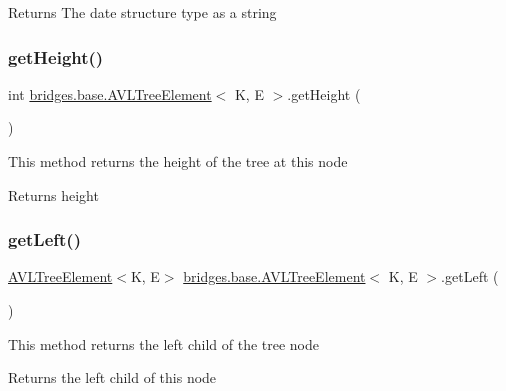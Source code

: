 \begin{DoxyReturn}{Returns}
The date structure type as a string 
\end{DoxyReturn}
\mbox{\label{classbridges_1_1base_1_1_a_v_l_tree_element_a52fe2886334c841547d238db69022697}} 
\subsubsection{\texorpdfstring{get\+Height()}{getHeight()}}
{\footnotesize\ttfamily int \mbox{\hyperlink{classbridges_1_1base_1_1_a_v_l_tree_element}{bridges.\+base.\+A\+V\+L\+Tree\+Element}}$<$ K, E $>$.get\+Height (\begin{DoxyParamCaption}{ }\end{DoxyParamCaption})}

This method returns the height of the tree at this node

\begin{DoxyReturn}{Returns}
height 
\end{DoxyReturn}
\mbox{\label{classbridges_1_1base_1_1_a_v_l_tree_element_a86f1329b19d2886ba7bf713e3844ecd6}} 
\subsubsection{\texorpdfstring{get\+Left()}{getLeft()}}
{\footnotesize\ttfamily \mbox{\hyperlink{classbridges_1_1base_1_1_a_v_l_tree_element}{A\+V\+L\+Tree\+Element}}$<$K, E$>$ \mbox{\hyperlink{classbridges_1_1base_1_1_a_v_l_tree_element}{bridges.\+base.\+A\+V\+L\+Tree\+Element}}$<$ K, E $>$.get\+Left (\begin{DoxyParamCaption}{ }\end{DoxyParamCaption})}

This method returns the left child of the tree node

\begin{DoxyReturn}{Returns}
the left child of this node 
\end{DoxyReturn}
\mbox{\label{classbridges_1_1base_1_1_a_v_l_tree_element_aab93418ac19605f2c7c57aa38d110921}} 
